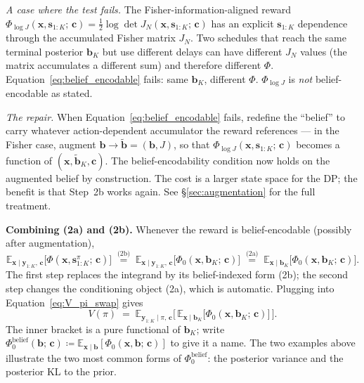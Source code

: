 \documentclass[11pt]{article}
\newcommand{\bc}{\bm{c}}
\newcommand{\bx}{\bm{x}}
\newcommand{\by}{\bm{y}}
\newcommand{\bs}{\bm{s}}
\newcommand{\bb}{\bm{b}}
\newcommand{\E}{\mathbb{E}}
\begin{document}
\emph{A case where the test fails.}  The Fisher-information-aligned reward $\Phi_{\log J}(\bx, \bs_{1:K};\, \bc) = \tfrac{1}{2} \log \det J_N(\bx, \bs_{1:K};\, \bc)$ has an explicit $\bs_{1:K}$ dependence through the accumulated Fisher matrix $J_N$.  Two schedules that reach the same terminal posterior $\bb_K$ but use different delays can have different $J_N$ values (the matrix accumulates a different sum) and therefore different $\Phi$.  Equation~\eqref{eq:belief_encodable} fails: same $\bb_K$, different $\Phi$.  $\Phi_{\log J}$ is \emph{not} belief-encodable as stated.

\emph{The repair.}  When Equation~\eqref{eq:belief_encodable} fails, redefine the ``belief'' to carry whatever action-dependent accumulator the reward references --- in the Fisher case, augment $\bb \to \tilde{\bb} = (\bb, J)$, so that $\Phi_{\log J}(\bx, \bs_{1:K};\, \bc)$ becomes a function of $(\bx, \tilde{\bb}_K, \bc)$.  The belief-encodability condition now holds on the augmented belief by construction.  The cost is a larger state space for the DP; the benefit is that Step~2b works again.  See §\ref{sec:augmentation} for the full treatment.

\textbf{Combining (2a) and (2b).}  Whenever the reward is belief-encodable (possibly after augmentation),
\begin{equation}
\E_{\bx \mid \by_{1:K},\, \bc}\!\bigl[\Phi(\bx, \bs_{1:K}^\pi;\, \bc)\bigr]
\;\stackrel{\text{(2b)}}{=}\;
\E_{\bx \mid \by_{1:K},\, \bc}\!\bigl[\Phi_0(\bx, \bb_K;\, \bc)\bigr]
\;\stackrel{\text{(2a)}}{=}\;
\E_{\bx \mid \bb_K}\!\bigl[\Phi_0(\bx, \bb_K;\, \bc)\bigr].
\end{equation}
The first step replaces the integrand by its belief-indexed form (2b); the second step changes the conditioning object (2a), which is automatic.  Plugging into Equation~\eqref{eq:V_pi_swap} gives
\begin{equation}
V(\pi) \;=\; \E_{\by_{1:K} \mid \pi,\, \bc}\!\bigl[\, \E_{\bx \mid \bb_K}\!\bigl[\Phi_0(\bx, \bb_K;\, \bc)\bigr] \,\bigr].
\label{eq:V_pi_belief}
\end{equation}
The inner bracket is a pure functional of $\bb_K$; write $\Phi_0^{\mathrm{belief}}(\bb;\, \bc) \coloneqq \E_{\bx \mid \bb}[\Phi_0(\bx, \bb;\, \bc)]$ to give it a name.  The two examples above illustrate the two most common forms of $\Phi_0^{\mathrm{belief}}$: the posterior variance and the posterior KL to the prior.
\end{document}
